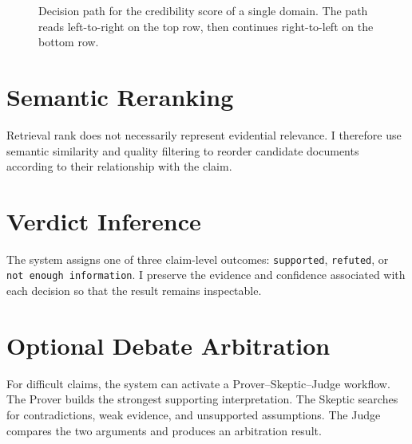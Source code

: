 \documentclass[12pt,a4paper,openany]{report}
\begin{document}
\begin{figure}[H]
\centering
{}
\caption{Decision path for the credibility score of a single domain. The path reads left-to-right on the top row, then continues right-to-left on the bottom row.}
\label{fig:credibility-flow}
\end{figure}

\section{Semantic Reranking}
Retrieval rank does not necessarily represent evidential relevance. I therefore use semantic similarity and quality filtering to reorder candidate documents according to their relationship with the claim.

\section{Verdict Inference}
The system assigns one of three claim-level outcomes: \texttt{supported}, \texttt{refuted}, or \texttt{not enough information}. I preserve the evidence and confidence associated with each decision so that the result remains inspectable.

\section{Optional Debate Arbitration}
For difficult claims, the system can activate a Prover--Skeptic--Judge workflow. The Prover builds the strongest supporting interpretation. The Skeptic searches for contradictions, weak evidence, and unsupported assumptions. The Judge compares the two arguments and produces an arbitration result.
\end{document}
